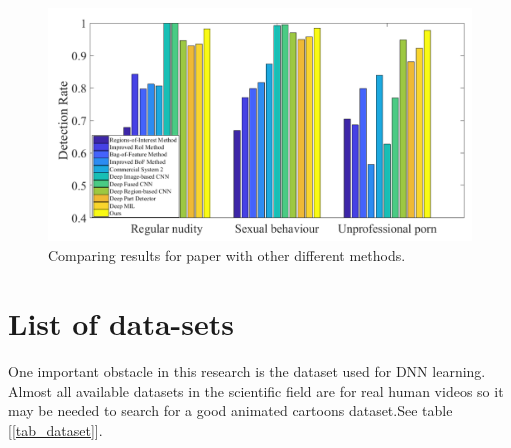 \documentclass[runningheads]{llncs}
\begin{document}
\begin{figure}
\centering
\includegraphics[width=.8\textwidth]{figures/results.png}
\caption{Comparing results for paper \cite{jin2018pornographic}  with other different methods.} \label{fig_results}
\end{figure}

\section{List of data-sets}
One important obstacle in this research is the dataset used for DNN learning. Almost all available datasets in the scientific field are for real human videos so it may be needed to search for a good animated cartoons dataset.See table [\ref{tab_dataset}].
\end{document}
